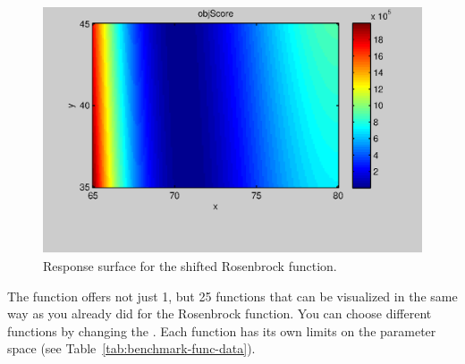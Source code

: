 \begin{figure}[htbp]
  \centering
    \includegraphics[width=1.0\textwidth]{./../eps/respsurf-rosenbrock.eps}
  \caption{Response surface for the shifted Rosenbrock function.}
  \label{fig:respsurf-rosenbrock}
\end{figure}

The  function offers not just 1, but 25 functions that can be visualized in the same way as you already did for the Rosenbrock function. You can choose different functions by changing the . Each function has its own limits on the parameter space (see Table~\ref{tab:benchmark-func-data}).

